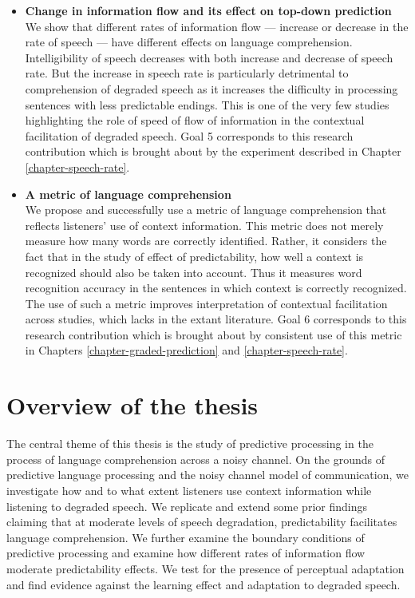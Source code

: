 \documentclass[a4paper, nobind]{templates/ociamthesis}
\begin{document}
\begin{itemize}
\item
  \textbf{Change in information flow and its effect on top-down prediction}\\
  We show that different rates of information flow --- increase or decrease in the rate of speech --- have different effects on language comprehension.
  Intelligibility of speech decreases with both increase and decrease of speech rate.
  But the increase in speech rate is particularly detrimental to comprehension of degraded speech as it increases the difficulty in processing sentences with less predictable endings.
  This is one of the very few studies highlighting the role of speed of flow of information in the contextual facilitation of degraded speech.
  Goal 5 corresponds to this research contribution which is brought about by the experiment described in Chapter \ref{chapter-speech-rate}.
\item
  \textbf{A metric of language comprehension}\\
  We propose and successfully use a metric of language comprehension that reflects listeners' use of context information.
  This metric does not merely measure how many words are correctly identified.
  Rather, it considers the fact that in the study of effect of predictability, how well a context is recognized should also be taken into account.
  Thus it measures word recognition accuracy in the sentences in which context is correctly recognized.
  The use of such a metric improves interpretation of contextual facilitation across studies, which lacks in the extant literature.
  Goal 6 corresponds to this research contribution which is brought about by consistent use of this metric in Chapters \ref{chapter-graded-prediction} and \ref{chapter-speech-rate}.
\end{itemize}

\hypertarget{overview-of-the-thesis}{%
\section{Overview of the thesis}\label{overview-of-the-thesis}}

The central theme of this thesis is the study of predictive processing in the process of language comprehension across a noisy channel.
On the grounds of predictive language processing and the noisy channel model of communication,
we investigate how and to what extent listeners use context information while listening to degraded speech.
We replicate and extend some prior findings claiming that at moderate levels of speech degradation,
predictability facilitates language comprehension.
We further examine the boundary conditions of predictive processing and examine how different rates of information flow moderate predictability effects.
We test for the presence of perceptual adaptation and find evidence against the learning effect and adaptation to degraded speech.
\end{document}
